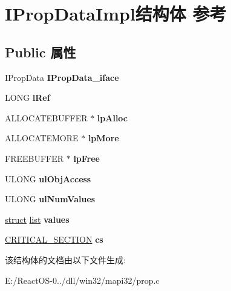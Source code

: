 \hypertarget{struct_i_prop_data_impl}{}\section{I\+Prop\+Data\+Impl结构体 参考}
\label{struct_i_prop_data_impl}
\subsection*{Public 属性}
\begin{DoxyCompactItemize}
\item 
\mbox{\label{struct_i_prop_data_impl_ac9dc1e40ab3224830c892dfb12570ce4}} 
I\+Prop\+Data {\bfseries I\+Prop\+Data\+\_\+iface}
\item 
\mbox{\label{struct_i_prop_data_impl_ac141d051a8637fb936fc380f2cf2c4ae}} 
L\+O\+NG {\bfseries l\+Ref}
\item 
\mbox{\label{struct_i_prop_data_impl_a11541bf7ed6bb008a23d0740e317b19d}} 
A\+L\+L\+O\+C\+A\+T\+E\+B\+U\+F\+F\+ER $\ast$ {\bfseries lp\+Alloc}
\item 
\mbox{\label{struct_i_prop_data_impl_aa1b51ad911c7aeef2576b7d2ab2e2023}} 
A\+L\+L\+O\+C\+A\+T\+E\+M\+O\+RE $\ast$ {\bfseries lp\+More}
\item 
\mbox{\label{struct_i_prop_data_impl_a037ea11a4fc5d9cd0423b90e177ea555}} 
F\+R\+E\+E\+B\+U\+F\+F\+ER $\ast$ {\bfseries lp\+Free}
\item 
\mbox{\label{struct_i_prop_data_impl_af3e8fb6e6920e7f14804c8a750117cfc}} 
U\+L\+O\+NG {\bfseries ul\+Obj\+Access}
\item 
\mbox{\label{struct_i_prop_data_impl_a589252bbe0aab91979ad15fb23eedfab}} 
U\+L\+O\+NG {\bfseries ul\+Num\+Values}
\item 
\mbox{\label{struct_i_prop_data_impl_abbef8a42ab1c064031fc2f1ee488fbbd}} 
\hyperlink{interfacestruct}{struct} \hyperlink{classlist}{list} {\bfseries values}
\item 
\mbox{\label{struct_i_prop_data_impl_aafa038d769e0bbaf646f40095f4135de}} 
\hyperlink{struct___c_r_i_t_i_c_a_l___s_e_c_t_i_o_n}{C\+R\+I\+T\+I\+C\+A\+L\+\_\+\+S\+E\+C\+T\+I\+ON} {\bfseries cs}
\end{DoxyCompactItemize}


该结构体的文档由以下文件生成\+:\begin{DoxyCompactItemize}
\item 
E\+:/\+React\+O\+S-\/0../dll/win32/mapi32/prop.\+c\end{DoxyCompactItemize}
